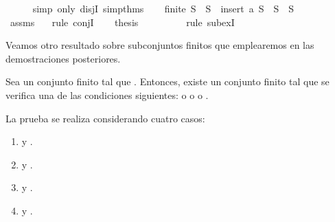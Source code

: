 \begin{isabellebody}
\ \ \ \ \isamarkupfalse%
\ {\isacharparenleft}simp\ only{\isacharcolon}\ disjI{}\ simp{\isacharunderscore}thms{\isacharparenright}\isanewline
\ \ \isamarkupfalse%
\ {\isachardoublequoteopen}finite\ S\ {\isasymand}\ {\isacharparenleft}S\ {\isacharequal}\ insert\ a\ S\ {\isasymor}\ S\ {\isacharequal}\ S{\isacharparenright}{\isachardoublequoteclose}\isanewline
\ \ \ \ \isamarkupfalse%
\ assms{\isacharparenleft}{}{\isacharparenright}\ {}\ \isamarkupfalse%
\ {\isacharparenleft}rule\ conjI{\isacharparenright}\isanewline
\ \ \isamarkupfalse%
\ {\isacharquery}thesis\ \isanewline
\ \ \ \ \isamarkupfalse%
\ {}\ \isamarkupfalse%
\ {\isacharparenleft}rule\ subexI{\isacharparenright}\isanewline
{}\isamarkupfalse%
%
\endisatagproof
{\isafoldproof}%
%
\isadelimproof
%
\endisadelimproof
%
\begin{isamarkuptext}%
Veamos otro resultado sobre subconjuntos finitos que emplearemos en las demostraciones
  posteriores.

\begin{lema}
  Sea  un conjunto finito tal que . Entonces, existe un conjunto finito  
  tal que se verifica una de las condiciones siguientes:  o  o 
   o .
\end{lema}

\begin{demostracion}
  La prueba se realiza considerando cuatro casos:
  \begin{enumerate}
    \item {} y . 
    \item {} y . 
    \item {} y .
    \item {} y . 
  \end{enumerate}


\end{demostracion}
\end{isamarkuptext}
\end{isabellebody}
